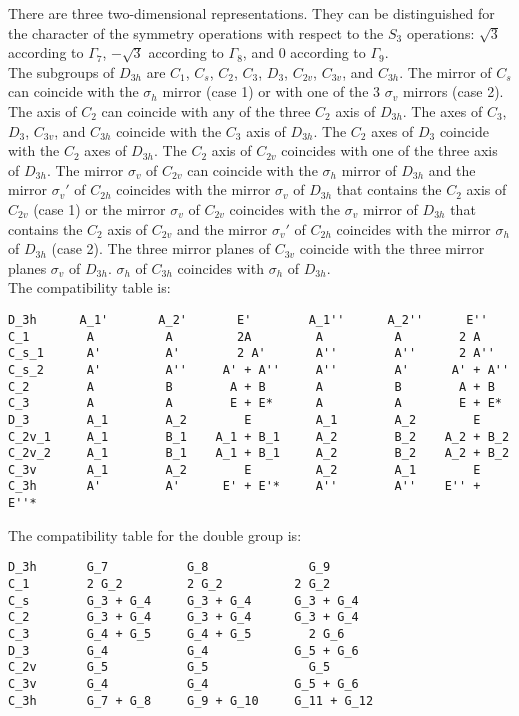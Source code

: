 \documentclass[12pt,a4paper]{article}
\begin{document}
There are three two-dimensional representations. They can be distinguished
for the character of the symmetry operations with respect to the $S_3$
operations: $\sqrt{3}$ according to $\Gamma_7$, $-\sqrt{3}$ according
to $\Gamma_8$, and $0$ according to $\Gamma_9$. \\
The subgroups of $D_{3h}$ are $C_1$, $C_s$, $C_2$, $C_3$, $D_3$, $C_{2v}$, 
$C_{3v}$, and $C_{3h}$. The mirror of $C_s$ can coincide with the $\sigma_h$ mirror 
(case 1) or with one of the $3$ $\sigma_v$ mirrors (case 2). 
The axis of $C_2$ can coincide with any of the three $C_2$ axis of $D_{3h}$. 
The axes of $C_3$, $D_3$, $C_{3v}$, and $C_{3h}$ coincide with the $C_3$ axis 
of $D_{3h}$. The $C_2$ axes of $D_3$ coincide
with the $C_2$ axes of $D_{3h}$. 
The $C_2$ axis of $C_{2v}$ coincides with one of the three axis of $D_{3h}$.
The mirror $\sigma_v$ of $C_{2v}$ can coincide with the $\sigma_h$ mirror of $D_{3h}$
and the mirror $\sigma_v'$ of $C_{2h}$ coincides with the mirror $\sigma_v$ 
of $D_{3h}$ that contains the $C_2$ axis of $C_{2v}$ (case 1) or
the mirror $\sigma_v$ of $C_{2v}$ coincides with the $\sigma_v$ mirror of $D_{3h}$
that contains the $C_2$ axis of $C_{2v}$ and the mirror $\sigma_v'$ of $C_{2h}$ 
coincides with the mirror $\sigma_h$ of $D_{3h}$ (case 2). 
The three mirror planes of $C_{3v}$ coincide with the three mirror planes
$\sigma_v$ of $D_{3h}$. $\sigma_h$ of $C_{3h}$ coincides
with $\sigma_h$ of $D_{3h}$. \\
The compatibility table is:
\begin{verbatim}
D_3h      A_1'       A_2'       E'        A_1''      A_2''      E''
C_1        A          A         2A         A          A        2 A
C_s_1      A'         A'        2 A'       A''        A''      2 A''
C_s_2      A'         A''     A' + A''     A''        A'      A' + A''
C_2        A          B        A + B       A          B        A + B
C_3        A          A        E + E*      A          A        E + E*
D_3        A_1        A_2        E         A_1        A_2        E
C_2v_1     A_1        B_1    A_1 + B_1     A_2        B_2    A_2 + B_2
C_2v_2     A_1        B_1    A_1 + B_1     A_2        B_2    A_2 + B_2
C_3v       A_1        A_2        E         A_2        A_1        E
C_3h       A'         A'      E' + E'*     A''        A''    E'' + E''*
\end{verbatim}
The compatibility table for the double group is:
\begin{verbatim}
D_3h       G_7           G_8              G_9
C_1        2 G_2         2 G_2          2 G_2
C_s        G_3 + G_4     G_3 + G_4      G_3 + G_4
C_2        G_3 + G_4     G_3 + G_4      G_3 + G_4
C_3        G_4 + G_5     G_4 + G_5        2 G_6
D_3        G_4           G_4            G_5 + G_6
C_2v       G_5           G_5              G_5
C_3v       G_4           G_4            G_5 + G_6
C_3h       G_7 + G_8     G_9 + G_10     G_11 + G_12
\end{verbatim}
\end{document}
